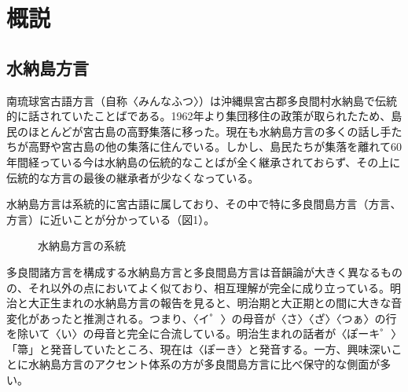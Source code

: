 \chapter*{概説}\label{gaisetu}\thispagestyle{plain}\setcounter{chapter}{1}

\section{水納島方言}
南琉球宮古語方言（自称〈みんなふつ\heiban{}〉）は沖縄県宮古郡多良間村水納島で伝統的に話されていたことばである。1962年より集団移住の政策が取られたため、島民のほとんどが宮古島の高野集落に移った。現在も水納島方言の多くの話し手たちが高野や宮古島の他の集落に住んでいる。しかし、島民たちが集落を離れて60年間経っている今は水納島の伝統的なことばが全く継承されておらず、その上に伝統的な方言の最後の継承者が少なくなっている。



水納島方言は系統的に宮古語に属しており、その中で特に多良間島方言（方言、方言）に近いことが分かっている（図1）\citep{lawrence03:taramakeito,pellard09:phdthesis,celik20:phdthesis,celik20:minna}。

\begin{figure}[ht!]\centering
{}
\caption{水納島方言の系統}\label{fg:keito}
\end{figure}


多良間諸方言を構成する水納島方言と多良間島方言は音韻論が大きく異なるものの、それ以外の点においてよく似ており、相互理解が完全に成り立っている。明治と大正生まれの水納島方言の報告\citep{zenshuraku:minna}を見ると、明治期と大正期との間に大きな音変化があったと推測される。つまり、〈イ゜〉の母音が〈さ〉〈ざ〉〈つぁ〉の行を除いて〈い〉の母音と完全に合流している。明治生まれの話者が〈ぽーキ゜〉「箒」と発音していたところ、現在は〈ぽーき〉と発音する。一方、興味深いことに水納島方言のアクセント体系の方が多良間島方言に比べ保守的な側面が多い。


